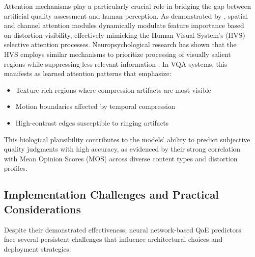 Attention mechanisms play a particularly crucial role in bridging the gap between artificial quality assessment and human perception. As demonstrated by \cite{wu2022fastvqa}, spatial and channel attention modules dynamically modulate feature importance based on distortion visibility, effectively mimicking the Human Visual System's (HVS) selective attention processes. Neuropsychological research has shown that the HVS employs similar mechanisms to prioritize processing of visually salient regions while suppressing less relevant information \cite{itti1998model}. In VQA systems, this manifests as learned attention patterns that emphasize:
\begin{itemize}
    \item Texture-rich regions where compression artifacts are most visible
    \item Motion boundaries affected by temporal compression
    \item High-contrast edges susceptible to ringing artifacts
\end{itemize}
This biological plausibility contributes to the models' ability to predict subjective quality judgments with high accuracy, as evidenced by their strong correlation with Mean Opinion Scores (MOS) across diverse content types and distortion profiles. 

\subsection{Implementation Challenges and Practical Considerations}  
Despite their demonstrated effectiveness, neural network-based QoE predictors face several persistent challenges that influence architectural choices and deployment strategies:

